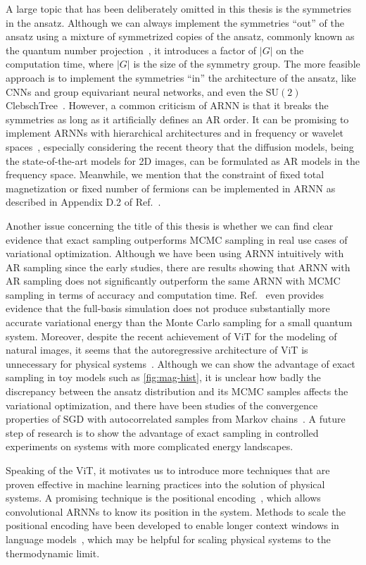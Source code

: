 A large topic that has been deliberately omitted in this thesis is the symmetries in the ansatz. Although we can always implement the symmetries ``out'' of the ansatz using a mixture of symmetrized copies of the ansatz, commonly known as the quantum number projection~\cite{tahara2008variational}, it introduces a factor of $|G|$ on the computation time, where $|G|$ is the size of the symmetry group. The more feasible approach is to implement the symmetries ``in'' the architecture of the ansatz, like CNNs and group equivariant neural networks, and even the $\mathrm{SU}(2)$ ClebschTree~\cite{vieijra2021many}. However, a common criticism of ARNN is that it breaks the symmetries as long as it artificially defines an AR order. It can be promising to implement ARNNs with hierarchical architectures and in frequency or wavelet spaces~\cite{nash2021generating, bialas2022hierarchical, hoogeboom2022autoregressive, mattar2024wavelets}, especially considering the recent theory that the diffusion models, being the state-of-the-art models for 2D images, can be formulated as AR models in the frequency space. Meanwhile, we mention that the constraint of fixed total magnetization or fixed number of fermions can be implemented in ARNN as described in Appendix D.2 of Ref.~\cite{hibat2020recurrent}.

Another issue concerning the title of this thesis is whether we can find clear evidence that exact sampling outperforms MCMC sampling in real use cases of variational optimization. Although we have been using ARNN intuitively with AR sampling since the early studies, there are results showing that ARNN with AR sampling does not significantly outperform the same ARNN with MCMC sampling in terms of accuracy and computation time. Ref.~\cite{bukov2021learning} even provides evidence that the full-basis simulation does not produce substantially more accurate variational energy than the Monte Carlo sampling for a small quantum system. Moreover, despite the recent achievement of ViT for the modeling of natural images, it seems that the autoregressive architecture of ViT is unnecessary for physical systems~\cite{viteritti2023transformer, rende2024queries}. Although we can show the advantage of exact sampling in toy models such as \cref{fig:mag-hist}, it is unclear how badly the discrepancy between the ansatz distribution and its MCMC samples affects the variational optimization, and there have been studies of the convergence properties of SGD with autocorrelated samples from Markov chains~\cite{sun2018markov}. A future step of research is to show the advantage of exact sampling in controlled experiments on systems with more complicated energy landscapes.


Speaking of the ViT, it motivates us to introduce more techniques that are proven effective in machine learning practices into the solution of physical systems. A promising technique is the positional encoding~\cite{ke2021rethinking}, which allows convolutional ARNNs to know its position in the system. Methods to scale the positional encoding have been developed to enable longer context windows in language models~\cite{liu2024scaling, peng2024yarn}, which may be helpful for scaling physical systems to the thermodynamic limit.
